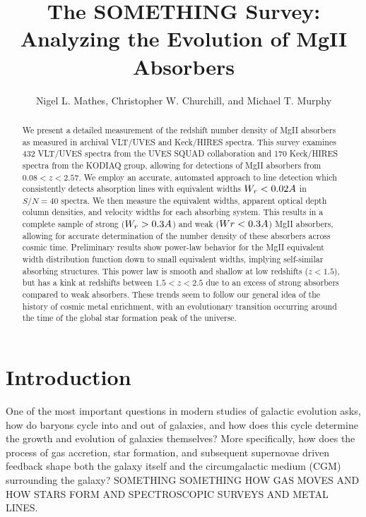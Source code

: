 \message{ !name(Paper_v1.tex)}\documentclass[iop,apj,numberedappendix,appendixfloats,twocolappendix]{emulateapj}
\begin{document}


\title{The SOMETHING Survey: Analyzing the Evolution of MgII Absorbers}

\author{
Nigel L. Mathes,
Christopher W. Churchill,
and
Michael T. Murphy
}


\begin{abstract}
We present a detailed measurement of the redshift number density of MgII absorbers as measured in archival VLT/UVES and Keck/HIRES spectra. This survey examines 432 VLT/UVES spectra from the UVES SQUAD collaboration and 170 Keck/HIRES spectra from the KODIAQ group, allowing for detections of MgII absorbers from $0.08 < z < 2.57$. We employ an accurate, automated approach to line detection which consistently detects absorption lines with equivalent widths $W_r < 0.02\AA$ in $S/N = 40$ spectra. We then measure the equivalent widths, apparent optical depth column densities, and velocity widths for each absorbing system. This results in a complete sample of strong ($W_r > 0.3\AA$) and weak ($Wr < 0.3\AA$) MgII absorbers, allowing for accurate determination of the number density of these absorbers across cosmic time. Preliminary results show power-law behavior for the MgII equivalent width distribution function down to small equivalent widths, implying self-similar absorbing structures. This power law is smooth and shallow at low redshifts ($z < 1.5$), but has a kink at redshifts between $1.5 < z < 2.5$ due to an excess of strong absorbers compared to weak absorbers. These trends seem to follow our general idea of the history of cosmic metal enrichment, with an evolutionary transition occurring around the time of the global star formation peak of the universe.

\end{abstract}



\section{Introduction}
\label{sec:intro}

One of the most important questions in modern studies of galactic evolution asks, how do baryons cycle into and out of galaxies, and how does this cycle determine the growth and evolution of galaxies themselves? More specifically, how does the process of gas accretion, star formation, and subsequent supernovae driven feedback shape both the galaxy itself and the circumgalactic medium (CGM) surrounding the galaxy? SOMETHING SOMETHING HOW GAS MOVES AND HOW STARS FORM AND SPECTROSCOPIC SURVEYS AND METAL LINES.
\end{document}
